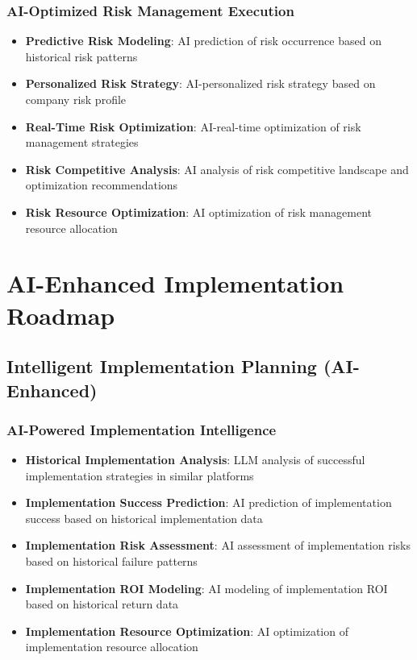 \subsubsection{AI-Optimized Risk Management Execution}

\begin{itemize}
    \item \textbf{Predictive Risk Modeling}: AI prediction of risk occurrence based on historical risk patterns
    \item \textbf{Personalized Risk Strategy}: AI-personalized risk strategy based on company risk profile
    \item \textbf{Real-Time Risk Optimization}: AI-real-time optimization of risk management strategies
    \item \textbf{Risk Competitive Analysis}: AI analysis of risk competitive landscape and optimization recommendations
    \item \textbf{Risk Resource Optimization}: AI optimization of risk management resource allocation
\end{itemize}

\section{AI-Enhanced Implementation Roadmap}

\subsection{Intelligent Implementation Planning (AI-Enhanced)}

\subsubsection{AI-Powered Implementation Intelligence}

\begin{itemize}
    \item \textbf{Historical Implementation Analysis}: LLM analysis of successful implementation strategies in similar platforms
    \item \textbf{Implementation Success Prediction}: AI prediction of implementation success based on historical implementation data
    \item \textbf{Implementation Risk Assessment}: AI assessment of implementation risks based on historical failure patterns
    \item \textbf{Implementation ROI Modeling}: AI modeling of implementation ROI based on historical return data
    \item \textbf{Implementation Resource Optimization}: AI optimization of implementation resource allocation
\end{itemize}

